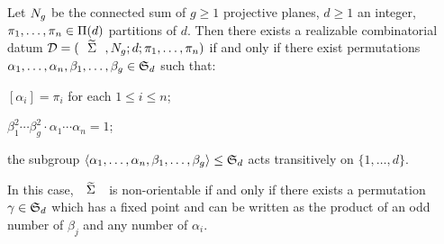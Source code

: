 \begin{corollary}\label{hurwitz:th:monodromy-realizability-non-orientable}
Let $N_{g}$ be the connected sum of $g\ge 1$ projective planes, $d\ge 1$ an integer, $\pi_1,\ldots,\pi_n\in\Pi(d)$ partitions of $d$. Then there exists a realizable combinatorial datum $\DD=\datum{\tSigma,\nosurf{g}}{d}{\pi_1,\ldots,\pi_n}$ if and only if there exist permutations $\alpha_1,\ldots,\alpha_n,\beta_1,\ldots,\beta_g\in\symgroup[d]$ such that:
\begin{enumroman}
\item $[\alpha_i]=\pi_i$ for each $1\le i\le n$;
\item $\beta_1^2\cdots\beta_g^2\cdot\alpha_1\cdots\alpha_n=1$;
\item the subgroup $\angled{\alpha_1,\ldots,\alpha_n,\beta_1,\ldots,\beta_g}\subgroup\symgroup[d]$ acts transitively on $\{1,\ldots,d\}$.
\end{enumroman}
In this case, $\tSigma$ is non-orientable if and only if there exists a permutation $\gamma\in\symgroup[d]$ which has a fixed point and can be written as the product of an odd number of $\beta_j$ and any number of $\alpha_i$.
\end{corollary}
